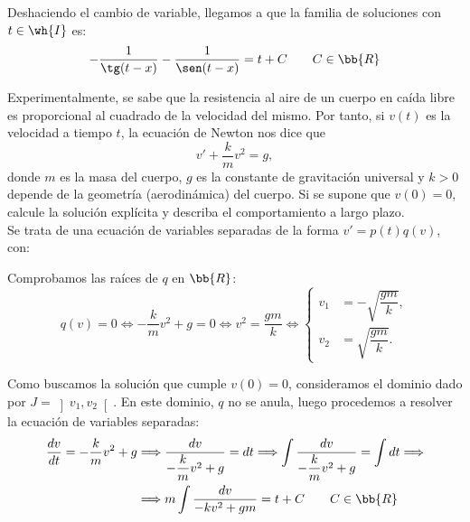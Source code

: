 \begin{ejercicio}
    Deshaciendo el cambio de variable, llegamos a que la familia de soluciones con $t\in \wh{I}$ es:
    \begin{equation*}
        -\dfrac{1}{\tg(t-x)} -\dfrac{1}{\sen(t-x)} = t + C \qquad C\in \bb{R}
    \end{equation*}
\end{ejercicio}

\begin{ejercicio}
    Experimentalmente, se sabe que la resistencia al aire de un cuerpo en caída libre es proporcional al cuadrado de la velocidad del mismo. Por tanto, si $v(t)$ es la velocidad a tiempo $t$, la ecuación de Newton nos dice que
    \begin{equation*}
        v' + \dfrac{k}{m}v^2 = g,
    \end{equation*}
    donde $m$ es la masa del cuerpo, $g$ es la constante de gravitación universal y $k > 0$ depende de la geometría (aerodinámica) del cuerpo. Si se supone que $v(0) = 0$, calcule la solución explícita y describa el comportamiento a largo plazo.\\

    Se trata de una ecuación de variables separadas de la forma $v' = p(t)q(v)$, con:

    Comprobamos las raíces de $q$ en $\bb{R}$:
    \begin{equation*}
        q(v) = 0 \Longleftrightarrow -\dfrac{k}{m}v^2 + g = 0 \Longleftrightarrow v^2 = \dfrac{gm}{k} \Longleftrightarrow \left\{
            \begin{aligned}
                v_1 &= -\sqrt{\dfrac{gm}{k}},\\
                v_2 &= \sqrt{\dfrac{gm}{k}}.
            \end{aligned}
        \right.
    \end{equation*}

    Como buscamos la solución que cumple $v(0)=0$, consideramos el dominio dado por $J=\left]v_1,v_2\right[$. En este dominio, $q$ no se anula, luego procedemos a resolver la ecuación de variables separadas:
    \begin{align*}
        \dfrac{dv}{dt} = -\dfrac{k}{m}v^2 + g &\Longrightarrow \dfrac{dv}{-\dfrac{k}{m}v^2 + g} = dt \Longrightarrow \int \dfrac{dv}{-\dfrac{k}{m}v^2 + g} = \int dt
        \Longrightarrow \\ &\Longrightarrow m\int \dfrac{dv}{-kv^2 + gm} = t + C \qquad C\in \bb{R}
    \end{align*}


\end{ejercicio}
